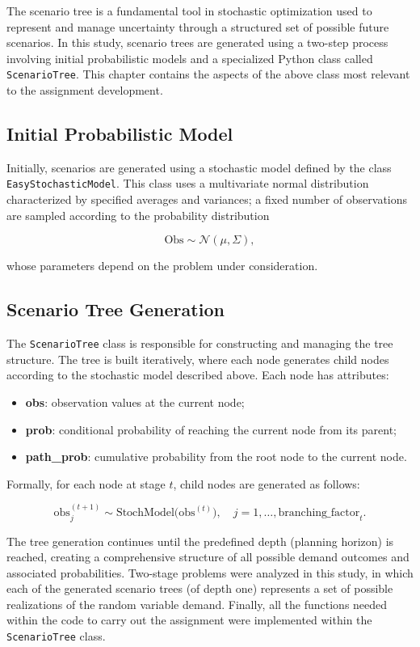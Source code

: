 \documentclass[a4paper,12pt]{article}
\begin{document}
	The scenario tree is a fundamental tool in stochastic optimization used to represent and manage uncertainty through a structured set of possible future scenarios. In this study, scenario trees are generated using a two-step process involving initial probabilistic models and a specialized Python class called \texttt{ScenarioTree}. This chapter contains the aspects of the above class most relevant to the assignment development.
	
	\subsection{Initial Probabilistic Model}
	
	Initially, scenarios are generated using a stochastic model defined by the class \texttt{EasyStochasticModel}. This class uses a multivariate normal distribution characterized by specified averages and variances; a fixed number of observations are sampled according to the probability distribution
	
	\[
	\text{Obs} \sim \mathcal{N}(\mu, \Sigma),
	\]
	
	whose parameters depend on the problem under consideration.	
	
	\subsection{Scenario Tree Generation}
	
	The \texttt{ScenarioTree} class is responsible for constructing and managing the tree structure. The tree is built iteratively, where each node generates child nodes according to the stochastic model described above. Each node has attributes:
	
	\begin{itemize}
		\item \textbf{obs}: observation values at the current node;
		\item \textbf{prob}: conditional probability of reaching the current node from its parent;
		\item \textbf{path\_prob}: cumulative probability from the root node to the current node.
	\end{itemize}
	
	Formally, for each node at stage $t$, child nodes are generated as follows:
	
	\[
	\text{obs}^{(t+1)}_j \sim \text{StochModel}\bigl(\text{obs}^{(t)}\bigr), \quad j=1, \dots, \text{branching\_factor}_t.
	\]
	
	The tree generation continues until the predefined depth (planning horizon) is reached, creating a comprehensive structure of all possible demand outcomes and associated probabilities. Two-stage problems were analyzed in this study, in which each of the generated scenario trees (of depth one) represents a set of possible realizations of the random variable demand. Finally, all the functions needed within the code to carry out the assignment were implemented within the \texttt{ScenarioTree} class.
	
\end{document}
